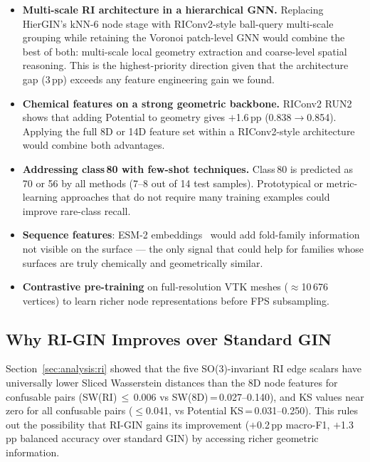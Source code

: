 \begin{itemize}
  \item \textbf{Multi-scale RI architecture in a hierarchical GNN.}
        Replacing HierGIN's kNN-6 node stage with RIConv2-style ball-query
        multi-scale grouping while retaining the Voronoi patch-level GNN
        would combine the best of both: multi-scale local geometry extraction
        and coarse-level spatial reasoning.
        This is the highest-priority direction given that the architecture gap
        (3\,pp) exceeds any feature engineering gain we found.

  \item \textbf{Chemical features on a strong geometric backbone.}
        RIConv2 RUN2 shows that adding Potential to geometry gives
        $+$1.6\,pp (0.838$\to$0.854).
        Applying the full 8D or 14D feature set within a RIConv2-style
        architecture would combine both advantages.

  \item \textbf{Addressing class\,80 with few-shot techniques.}
        Class\,80 is predicted as 70 or 56 by all methods (7--8 out of 14
        test samples).
        Prototypical or metric-learning approaches that do not require many
        training examples could improve rare-class recall.

  \item \textbf{Sequence features}: ESM-2 embeddings~\cite{esm2} would add
        fold-family information not visible on the surface --- the only signal
        that could help for families whose surfaces are truly chemically and
        geometrically similar.

  \item \textbf{Contrastive pre-training} on full-resolution VTK meshes
        ($\approx$10\,676 vertices) to learn richer node representations
        before FPS subsampling.
\end{itemize}

\subsection{Why RI-GIN Improves over Standard GIN}
\label{sec:analysis:ri_sep}

Section~\ref{sec:analysis:ri} showed that the five SO(3)-invariant RI edge
scalars have universally lower Sliced Wasserstein distances than the 8D node
features for confusable pairs (SW(RI)\,$\leq$\,0.006 vs SW(8D)\,=\,0.027--0.140),
and KS values near zero for all confusable pairs ($\leq$0.041, vs Potential
KS\,=\,0.031--0.250).
This rules out the possibility that RI-GIN gains its improvement
($+$0.2\,pp macro-F1, $+$1.3\,pp balanced accuracy over standard GIN)
by accessing richer geometric information.

